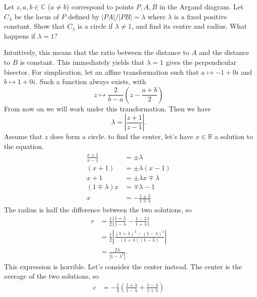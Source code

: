 \documentclass[12pt]{article}
\begin{document}
    \begin{question}
        Let $z,a,b \in \mathbb{C}$ ($a \ne b$)
        correspond to points $P,A,B$ in the Argand diagram.
        Let $C_\lambda$ be the locus of $P$ defined by $|PA|/|PB|=\lambda$
        where $\lambda$ is a fixed positive constant.
        Show that $C_\lambda$ is a circle if $\lambda \ne 1$,
        and find its centre and radius. 
        What happens if $\lambda = 1$?
    \end{question}
    \begin{answer}
        Intuitively, this means that the ratio between
        the distance to $A$ and the distance to $B$ is constant.
        This immediately yields that $\lambda=1$ gives the
        perpendicular bisector.
        For simplication, let an affine transformation
        such that $a \mapsto -1+0i$ and $b \mapsto 1+0i$. 
        Such a function always exists, with
        \[
        z \mapsto \frac{2}{b-a}\left(z - \frac{a+b}{2}\right)
        \]
        From now on we will work under this transformation.
        Then we have
        \[
            \lambda = \left|\frac{z+1}{z-1}\right|.
        \]
        Assume that $z$ does form a circle.
        to find the center, let's have $x \in \mathbb{R}$ a solution to the equation.
        \begin{align*}
            \frac{x+1}{x-1} &= \pm\lambda\\
            (x+1) &= \pm\lambda(x-1)\\
            x+1 &= \pm\lambda x \mp\lambda\\
            (1\mp\lambda)x &= \mp\lambda-1\\
            x &= -\frac{1\pm\lambda}{1\mp\lambda}
        \end{align*}
        The radius is half the difference between
        the two solutions, so
        \begin{align*}
            r
            &= \frac{1}{2}\left|\frac{1+\lambda}{1-\lambda} - \frac{1-\lambda}{1+\lambda}\right|\\
            &= \frac{1}{2}\left|\frac{(1+\lambda)^{2} - (1-\lambda)^{2}}{(1+\lambda)(1-\lambda)}\right|\\
            &= \frac{2\lambda}{|1-\lambda^{2}|}.
        \end{align*}
        This expression is horrible. Let's consider the center instead.
        The center is the average of the two solutions, so
        \begin{align*}
            c
            &= -\frac{1}{2}\left(\frac{1+\lambda}{1-\lambda} + \frac{1-\lambda}{1+\lambda}\right)\\

\end{align*}
\end{answer}
\end{document}

